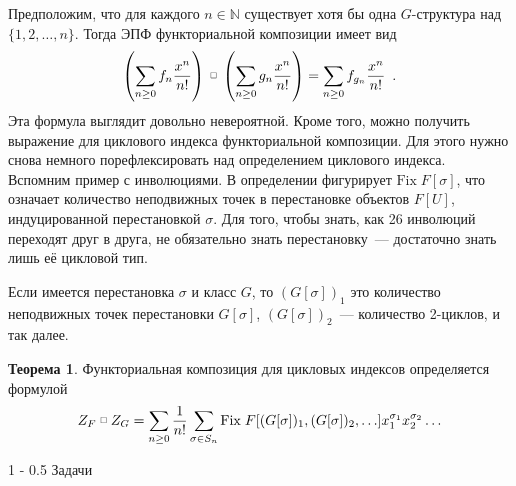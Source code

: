 \documentclass[a5paper]{article}
\makeatletter
\def \fprod {\; \raisebox{.3\height}{\scalebox{0.6}{$\square$}}\; }
\theoremstyle{definition}
\newtheorem*{theorem}{Теорема}
\renewcommand{\section}{\@startsection
{section}%
{1}%
{\z@}%
{-\baselineskip}%
{0.5\baselineskip}%
{\centering\large\scshape}} %
\makeatother
\begin{document}
Предположим, что для каждого \( n \in \mathbb N \) существует хотя бы одна \( G
\)-структура над \( \{1,2,\ldots, n\} \). Тогда ЭПФ функториальной композиции
имеет вид
\[
    \left(
    \sum_{n \geq 0} f_n \dfrac{x^n}{n!}
    \right)
    \fprod
    \left(
    \sum_{n \geq 0} g_n \dfrac{x^n}{n!}
    \right)
    = 
    \sum_{n \geq 0} f_{g_n} \dfrac{x^n}{n!} \enspace .
\]
Эта формула выглядит довольно невероятной. Кроме того, можно получить выражение
для циклового индекса функториальной композиции. Для этого нужно снова немного
порефлексировать над определением циклового индекса. Вспомним пример с
инволюциями. В определении фигурирует \(
\mathrm{Fix}\;F[\sigma]\), что означает количество неподвижных точек в
перестановке объектов \( F[U] \), индуцированной перестановкой \( \sigma \). Для
того, чтобы знать, как 26 инволюций переходят друг в друга, не обязательно знать
перестановку~--- достаточно знать лишь её цикловой тип.

Если имеется перестановка \(\sigma \) и класс \( G \), то \( (G[\sigma])_1 \)
это количество неподвижных точек перестановки \( G[\sigma] \), \( (G[\sigma])_2
\)~--- количество 2-циклов, и так далее.

\begin{theorem}
    Функториальная композиция для цикловых индексов определяется формулой
\[
    Z_F \fprod Z_G = \sum_{n \geq 0 } \dfrac{1}{n!} \sum_{\sigma \in S_n}
    \mathrm{Fix}\; F[(G[\sigma])_1, (G[\sigma])_2,
\ldots]x_1^{\sigma_1}x_2^{\sigma_2} \ldots
\]
\end{theorem}

\section{Задачи}
\end{document}
